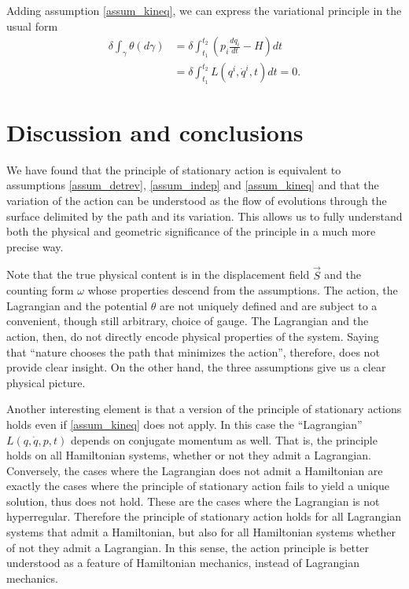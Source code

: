 \documentclass[fleqn,10pt]{wlscirep}
\begin{document}
Adding assumption \ref{assum_kineq}, we can express the variational principle in the usual form
\begin{equation}\label{mdof_Lagrangian}
	\begin{aligned}
		\delta \int_{\gamma} \theta(d\gamma) &= \delta \int^{t_2}_{t_1}\left( p_i \frac{dq_i}{dt} - H \right) dt \\
		&= \delta \int^{t_2}_{t_1}L(q^i, \dot{q}^i, t) dt = 0.
	\end{aligned}
\end{equation}

\section*{Discussion and conclusions}

We have found that the principle of stationary action is equivalent to assumptions \ref{assum_detrev}, \ref{assum_indep} and \ref{assum_kineq} and that the variation of the action can be understood as the flow of evolutions through the surface delimited by the path and its variation. This allows us to fully understand both the physical and geometric significance of the principle in a much more precise way.

Note that the true physical content is in the displacement field $\vec{S}$ and the counting form $\omega$ whose properties descend from the assumptions. The action, the Lagrangian and the potential $\theta$ are not uniquely defined and are subject to a convenient, though still arbitrary, choice of gauge. The Lagrangian and the action, then, do not directly encode physical properties of the system. Saying that ``nature chooses the path that minimizes the action'', therefore, does not provide clear insight. On the other hand, the three assumptions give us a clear physical picture.

Another interesting element is that a version of the principle of stationary actions holds even if \ref{assum_kineq} does not apply. In this case the ``Lagrangian'' $L(q,\dot{q},p,t)$ depends on conjugate momentum as well. That is, the principle holds on all Hamiltonian systems, whether or not they admit a Lagrangian. Conversely, the cases where the Lagrangian does not admit a Hamiltonian are exactly the cases where the principle of stationary action fails to yield a unique solution, thus does not hold. These are the cases where the Lagrangian is not hyperregular. Therefore the principle of stationary action holds for all Lagrangian systems that admit a Hamiltonian, but also for all Hamiltonian systems whether of not they admit a Lagrangian. In this sense, the action principle is better understood as a feature of Hamiltonian mechanics, instead of Lagrangian mechanics\cite{souriau1970structure, arnold1989mathematical}.
\end{document}
